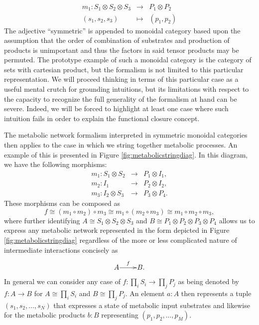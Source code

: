 \begin{eqnarray*}
m_1 \colon S_1 \otimes S_2 \otimes S_3 &\longrightarrow& P_1 \otimes P_2\\
(s_1,s_2,s_3) &\longmapsto& (p_1,p_2)
\end{eqnarray*}
The adjective ``symmetric'' is appended to monoidal category based upon the assumption that the order of combination of substrates and production of products is unimportant and thus the factors in said tensor products may be permuted. The prototype example of such a monoidal category is the category of sets with cartesian product, but the formalism is not limited to this particular representation. We will proceed thinking in terms of this particular case as a useful mental crutch for grounding intuitions, but its limitations with respect to the capacity to recognize the full generality of the formalism at hand can be severe. Indeed, we will be forced to highlight at least one case where such intuition fails in order to explain the functional closure concept.

The metabolic network formalism interpreted in symmetric monoidal categories then applies to the case in which we string together metabolic processes. An example of this is presented in Figure \ref{fig:metabolicstringdiag}. In this diagram, we have the following morphisms:
\begin{eqnarray*}
m_1 \colon S_1 \otimes S_2 &\longrightarrow& P_1 \otimes I_1,\\
m_2 \colon I_1 &\longrightarrow& P_2 \otimes I_2,\\
m_3 \colon I_2 \otimes S_3 &\longrightarrow& P_3 \otimes P_4.
\end{eqnarray*}
These morphisms can be composed as 
$$
f \cong (m_1 \circ m_2) \circ m_3 \cong m_1 \circ (m_2 \circ m_3) \cong m_1 \circ m_2 \circ m_3,
$$
where further identifying $A \cong S_1 \otimes S_2 \otimes S_3$ and $B \cong P_1 \otimes P_2 \otimes P_3 \otimes P_4$ allows us to express any metabolic network represented in the form depicted in Figure \ref{fig:metabolicstringdiag} regardless of the more or less complicated nature of intermediate interactions concisely as
$$
\xymatrix@1{
	A\ar[r]^-{f} & B.
	}
$$
In general we can consider any case of $f \colon \prod_i S_i \rightarrow \prod_j P_j$ as being denoted by $f \colon A \rightarrow B$ for $A \cong \prod_i S_i$ and $B \cong \prod_j P_j$. An element $a \colon A$ then represents a tuple $(s_1, s_2, \ldots, s_N)$ that expresses a state of metabolic input substrates and likewise for the metabolic products $b \colon B$ representing $(p_1, p_2, \ldots, p_M)$.

